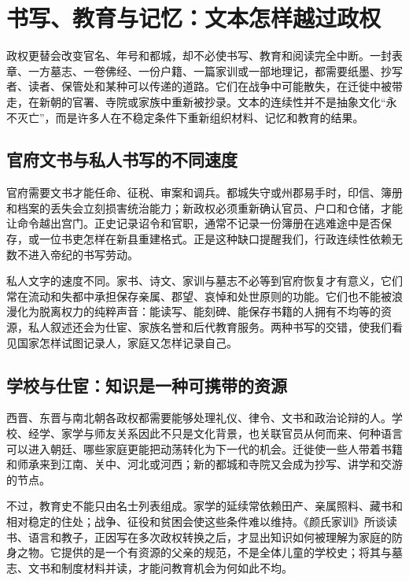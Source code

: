 \section{书写、教育与记忆：文本怎样越过政权}
\label{sec:synthesis-writing-learning}

政权更替会改变官名、年号和都城，却不必使书写、教育和阅读完全中断。一封表章、一方墓志、一卷佛经、一份户籍、一篇家训或一部地理记，都需要纸墨、抄写者、读者、保管处和某种可以传递的道路。它们在战争中可能散失，在迁徙中被带走，在新朝的官署、寺院或家族中重新被抄录。文本的连续性并不是抽象文化“永不灭亡”，而是许多人在不稳定条件下重新组织材料、记忆和教育的结果。

\subsection{官府文书与私人书写的不同速度}

官府需要文书才能任命、征税、审案和调兵。都城失守或州郡易手时，印信、簿册和档案的丢失会立刻损害统治能力；新政权必须重新确认官员、户口和仓储，才能让命令越出宫门。正史记录诏令和官职，通常不记录一份簿册在逃难途中是否保存，或一位书吏怎样在新县重建格式。正是这种缺口提醒我们，行政连续性依赖无数不进入帝纪的书写劳动。

私人文字的速度不同。家书、诗文、家训与墓志不必等到官府恢复才有意义，它们常在流动和失都中承担保存亲属、郡望、哀悼和处世原则的功能。它们也不能被浪漫化为脱离权力的纯粹声音：能读写、能刻碑、能保存书籍的人拥有不均等的资源，私人叙述还会为仕宦、家族名誉和后代教育服务。两种书写的交错，使我们看见国家怎样试图记录人，家庭又怎样记录自己。

\subsection{学校与仕宦：知识是一种可携带的资源}

西晋、东晋与南北朝各政权都需要能够处理礼仪、律令、文书和政治论辩的人。学校、经学、家学与师友关系因此不只是文化背景，也关联官员从何而来、何种语言可以进入朝廷、哪些家庭更能把动荡转化为下一代的机会。迁徙使一些人带着书籍和师承来到江南、关中、河北或河西；新的都城和寺院又会成为抄写、讲学和交游的节点。

不过，教育史不能只由名士列表组成。家学的延续常依赖田产、亲属照料、藏书和相对稳定的住处；战争、征役和贫困会使这些条件难以维持。《颜氏家训》所谈读书、语言和教子，正因写在多次政权转换之后，才显出知识如何被理解为家庭的防身之物。它提供的是一个有资源的父亲的规范，不是全体儿童的学校史；将其与墓志、文书和制度材料并读，才能问教育机会为何如此不均。

